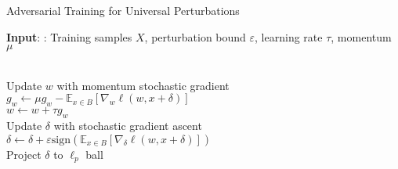 \begin{algorithm}
\caption{Adversarial Training for Universal Perturbations}\label{Alg_3}

 \textbf{Input}: : Training samples $X$, perturbation bound $\varepsilon$, learning rate $\tau$, momentum $\mu$ \\
\begin{algorithmic}[1]




 \\
\hspace{\algorithmicindent} Update $w$ with momentum stochastic gradient \\
\hspace{\algorithmicindent} \hspace{\algorithmicindent} $g_w \gets \mu g_w - \mathbb{E}_{x \in B} [\nabla_w \ell(w,x+\delta)]$ \\
\hspace{\algorithmicindent} \hspace{\algorithmicindent} $w \gets w + \tau g_w$ \\
\hspace{\algorithmicindent} Update $\delta$ with stochastic gradient ascent \\
\hspace{\algorithmicindent} \hspace{\algorithmicindent} $\delta \gets \delta + \varepsilon \text{sign}(\mathbb{E}_{x \in B}[\nabla_{\delta} \ell(w,x + \delta)])$ \\
\hspace{\algorithmicindent} Project $\delta$ to $\ell_p$ ball


\EndFor
\EndFor
\end{algorithmic}
\end{algorithm}

